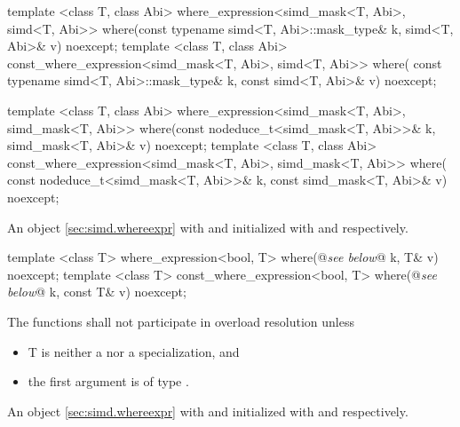 \begin{itemdecl}
template <class T, class Abi>
where_expression<simd_mask<T, Abi>, simd<T, Abi>> where(const typename simd<T, Abi>::mask_type& k,
                                                        simd<T, Abi>& v) noexcept;
template <class T, class Abi>
const_where_expression<simd_mask<T, Abi>, simd<T, Abi>> where(
    const typename simd<T, Abi>::mask_type& k, const simd<T, Abi>& v) noexcept;

template <class T, class Abi>
where_expression<simd_mask<T, Abi>, simd_mask<T, Abi>> where(const nodeduce_t<simd_mask<T, Abi>>& k,
                                                             simd_mask<T, Abi>& v) noexcept;
template <class T, class Abi>
const_where_expression<simd_mask<T, Abi>, simd_mask<T, Abi>> where(
    const nodeduce_t<simd_mask<T, Abi>>& k, const simd_mask<T, Abi>& v) noexcept;
\end{itemdecl}
\begin{itemdescr}
  \pnum\returns An object \ref{sec:simd.whereexpr} with  and  initialized with  and  respectively.
\end{itemdescr}

\begin{itemdecl}
template <class T> where_expression<bool, T> where(@\emph{see below}@ k, T& v) noexcept;
template <class T>
const_where_expression<bool, T> where(@\emph{see below}@ k, const T& v) noexcept;
\end{itemdecl}
\begin{itemdescr}
  \pnum\remarks The functions shall not participate in overload resolution unless
  \begin{itemize}
    \item \type T is neither a \simd nor a \mask specialization, and
    \item the first argument is of type \bool.
  \end{itemize}
  \pnum\returns An object \ref{sec:simd.whereexpr} with  and  initialized with  and  respectively.
\end{itemdescr}

